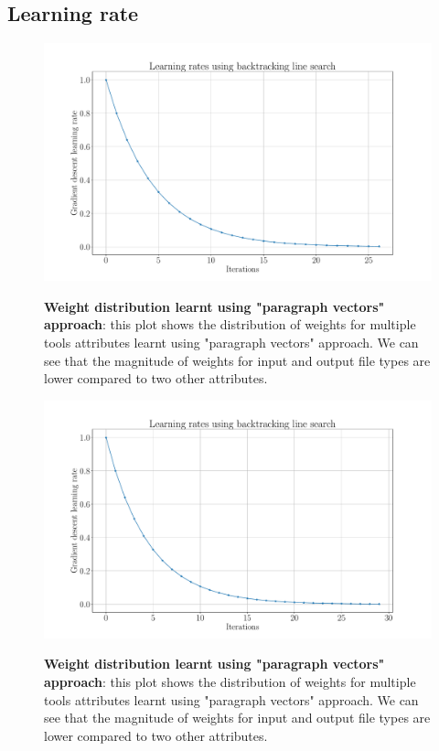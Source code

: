 \subsection{Learning rate}

\begin{figure}[h]
\begin{centering}
    {\includegraphics[scale=0.35]{figures/Learning_rates_LSI.pdf}}
    \caption[Weights distribution for doc2vec]{\textbf{Weight distribution learnt using "paragraph vectors" approach}: this plot shows the distribution of weights for multiple tools attributes learnt using "paragraph vectors" approach. We can see that the magnitude of weights for input and output file types are lower compared to two other attributes.}
\end{centering}
\end{figure}


\begin{figure}[h]
\begin{centering}
    {\includegraphics[scale=0.35]{figures/Learning_rates_PV.pdf}}
    \caption[Weights distribution for doc2vec]{\textbf{Weight distribution learnt using "paragraph vectors" approach}: this plot shows the distribution of weights for multiple tools attributes learnt using "paragraph vectors" approach. We can see that the magnitude of weights for input and output file types are lower compared to two other attributes.}
\end{centering}
\end{figure}


